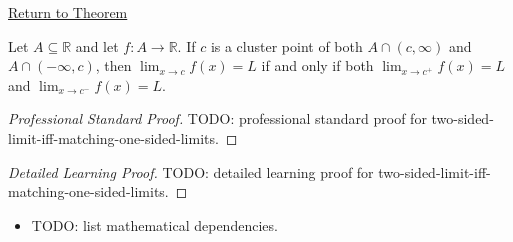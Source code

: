 \newpage
{}
\label{prf:two-sided-limit-iff-matching-one-sided-limits}

\begin{remark*}[Return]
\hyperref[thm:two-sided-limit-iff-matching-one-sided-limits]{Return to Theorem}
\end{remark*}

\begin{theorem*}
Let $A\subseteq\mathbb{R}$ and let $f:A\to\mathbb{R}$. If $c$ is a
cluster point of both $A\cap(c,\infty)$ and $A\cap(-\infty,c)$, then
$\lim_{x\to c}f(x)=L$ if and only if both $\lim_{x\to c^+}f(x)=L$ and
$\lim_{x\to c^-}f(x)=L$.

\smallskip\noindent
\end{theorem*}

\begin{proof}[Professional Standard Proof]
\LRAProofBodyStart
TODO: professional standard proof for two-sided-limit-iff-matching-one-sided-limits.
\end{proof}

\begin{proof}[Detailed Learning Proof]
\LRAProofBodyStart
TODO: detailed learning proof for two-sided-limit-iff-matching-one-sided-limits.
\end{proof}

\begin{remark*}
\end{remark*}

\begin{dependencies}
\begin{itemize}
  \item TODO: list mathematical dependencies.
\end{itemize}
\end{dependencies}

\clearpage
